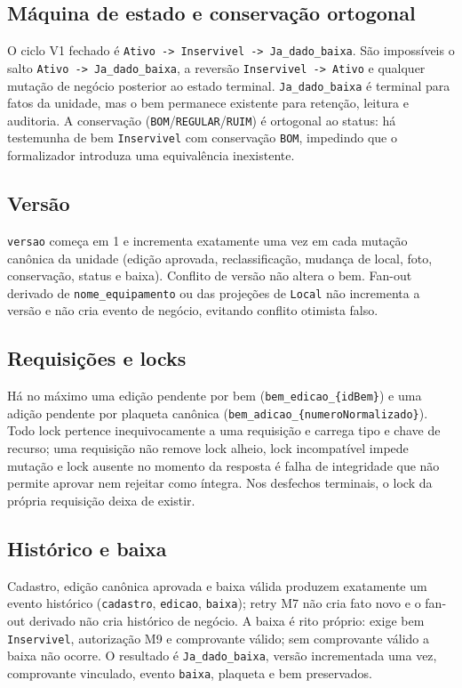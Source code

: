 \subsection*{Máquina de estado e conservação ortogonal}
O ciclo V1 fechado é \texttt{Ativo -> Inservivel -> Ja\_dado\_baixa}. São
impossíveis o salto \texttt{Ativo -> Ja\_dado\_baixa}, a reversão
\texttt{Inservivel -> Ativo} e qualquer mutação de negócio posterior ao estado
terminal. \texttt{Ja\_dado\_baixa} é terminal para fatos da unidade, mas o bem
permanece existente para retenção, leitura e auditoria. A conservação
(\texttt{BOM}/\texttt{REGULAR}/\texttt{RUIM}) é ortogonal ao status: há
testemunha de bem \texttt{Inservivel} com conservação \texttt{BOM}, impedindo
que o formalizador introduza uma equivalência inexistente.

\subsection*{Versão}
\texttt{versao} começa em 1 e incrementa exatamente uma vez em cada mutação
canônica da unidade (edição aprovada, reclassificação, mudança de local, foto,
conservação, status e baixa). Conflito de versão não altera o bem. Fan-out
derivado de \texttt{nome\_equipamento} ou das projeções de \texttt{Local} não
incrementa a versão e não cria evento de negócio, evitando conflito otimista
falso.

\subsection*{Requisições e locks}
Há no máximo uma edição pendente por bem (\texttt{bem\_edicao\_\{idBem\}}) e
uma adição pendente por plaqueta canônica
(\texttt{bem\_adicao\_\{numeroNormalizado\}}). Todo lock pertence
inequivocamente a uma requisição e carrega tipo e chave de recurso; uma
requisição não remove lock alheio, lock incompatível impede mutação e lock
ausente no momento da resposta é falha de integridade que não permite aprovar
nem rejeitar como íntegra. Nos desfechos terminais, o lock da própria
requisição deixa de existir.

\subsection*{Histórico e baixa}
Cadastro, edição canônica aprovada e baixa válida produzem exatamente um evento
histórico (\texttt{cadastro}, \texttt{edicao}, \texttt{baixa}); retry M7 não
cria fato novo e o fan-out derivado não cria histórico de negócio. A baixa é
rito próprio: exige bem \texttt{Inservivel}, autorização M9 e comprovante
válido; sem comprovante válido a baixa não ocorre. O resultado é
\texttt{Ja\_dado\_baixa}, versão incrementada uma vez, comprovante vinculado,
evento \texttt{baixa}, plaqueta e bem preservados.

